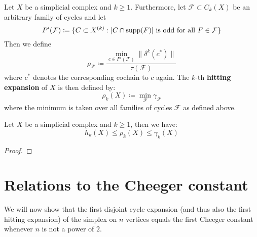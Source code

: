 \begin{defi}
Let \(X\) be a simplicial complex and \(k\geq 1\). Furthermore, let \(\mathcal{F}\subset C_k(X)\) be an arbitrary family of cycles and let
\[
P'(\mathcal{F})\coloneqq\{C\subset X^{(k)}:|C\cap\mathrm{supp}(F)|\text{ is odd for all }F\in\mathcal{F}\}
\]
Then we define
\[
\rho_{\mathcal{F}}\coloneqq\frac{\min\limits_{c\in P'(\mathcal{F})}\|\delta^k(c^*)\|}{\tau(\mathcal{F})}
\]
where \(c^*\) denotes the corresponding cochain to \(c\) again. The \(k\)-th \textbf{hitting expansion} of \(X\) is then defined by:
\[
\rho_k(X)\coloneqq\min\limits_{\mathcal{F}}\gamma_{\mathcal{F}}
\]
where the minimum is taken over all families of cycles \(\mathcal{F}\) as defined above.
\end{defi}

\begin{prop}\label{proposition411}
Let \(X\) be a simplicial complex and \(k\geq 1\), then we have:
\[
h_k(X)\leq\rho_k(X)\leq\gamma_k(X)
\]
\begin{proof}

\end{proof}
\end{prop}

\section{Relations to the Cheeger constant}

We will now show that the first disjoint cycle expansion (and thus also the first hitting expansion) of the simplex on \(n\) vertices equals the first Cheeger constant whenever \(n\) is not a power of \(2\).

